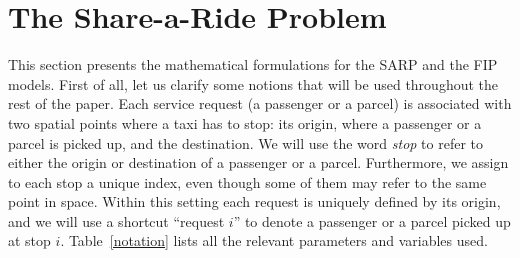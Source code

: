 \documentclass[preprint,authoryear,12pt]{elsarticle}
\begin{document}
\section{The Share-a-Ride Problem}\label{sarp_model}
This section presents the mathematical formulations for the SARP and the FIP models. First of all, let us clarify some notions that will be used throughout the rest of the paper. Each service request (a passenger or a parcel) is associated with two spatial points where a taxi has to stop: its origin, where a passenger or a parcel is picked up, and the destination. We will use the word \emph{stop} to refer to either the origin or destination of a passenger or a parcel. Furthermore, we assign to each stop a unique index, even though some of them may refer to the same point in space. Within this setting each request is uniquely defined by its origin, and we will use a shortcut ``request $i$'' to denote a passenger or a parcel picked up at stop $i$. Table~\ref{notation} lists all the relevant parameters and variables used.

\end{document}
